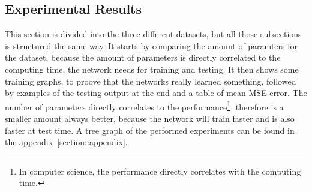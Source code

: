   
 \subsection{Experimental Results}
  This section is divided into the three different datasets, but all those subsections is structured the same way. It starts by comparing the amount of paramters
  for the dataset, because the amount of parameters is directly correlated to the computing time, the network needs for training and testing. It then shows
  some training graphs, to proove that the networks really learned something, followed by examples of the testing output at the end and a table of mean MSE error.
  The number of parameters directly correlates to the performance\footnote{In computer science, the performance directly correlates with the computing time.}, 
  therefore is a smaller amount always better, because the network will train faster and is also faster at test time. A tree graph of the performed experiments
  can be found in the appendix~\ref{section::appendix}.
  
